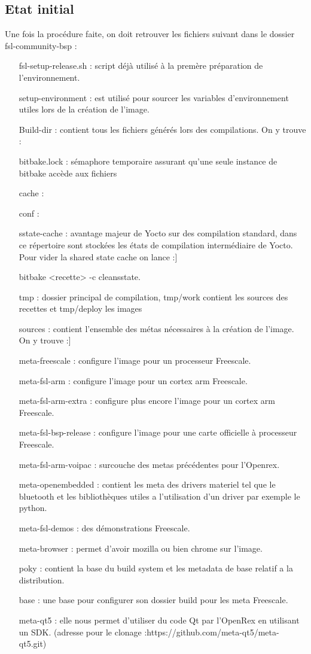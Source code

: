 	\subsection{Etat initial}
	Une fois la procédure faite, on doit retrouver les fichiers suivant dans le
	dossier fsl-community-bsp :
	\begin{itemize}
		\item[fsl-setup-release.sh :] script déjà utilisé à la premère préparation
		de l’environnement.
		\item[setup-environment :] est utilisé pour sourcer les variables d'environnement
		utiles lors de la création de l'image.
		\item[Build-dir :] contient tous les fichiers générés lors des compilations.
		On y trouve :
		\item[bitbake.lock :] sémaphore temporaire assurant qu’une seule instance de bitbake
		accède aux fichiers
		\item[cache :]
		\item[conf :]
		\item[sstate-cache :] avantage majeur de Yocto sur des compilation standard, dans ce répertoire sont stockées les états de compilation intermédiaire de Yocto. Pour vider la shared state cache on lance :]
		\begin{tcolorbox}
			bitbake <recette> -c cleansstate.
		\end{tcolorbox}

		\item[tmp :] dossier principal de compilation, tmp/work contient les sources des recettes et tmp/deploy les images
		\item[sources :] contient l'ensemble des     métas nécessaires à la création de l'image. On y trouve :]
		\item[meta-freescale :] configure l’image pour un processeur Freescale.
		\item[meta-fsl-arm :] configure l'image pour un cortex arm Freescale.
		\item[meta-fsl-arm-extra :] configure plus encore l'image pour un cortex arm Freescale.
		\item[meta-fsl-bsp-release :] configure l’image pour une carte officielle à processeur Freescale.
		\item[meta-fsl-arm-voipac :] surcouche des metas précédentes pour l’Openrex.
		\item[meta-openembedded :] contient les meta des drivers materiel tel que le bluetooth et les bibliothèques utiles a l'utilisation d’un driver par exemple le python.
		\item[meta-fsl-demos :] des démonstrations Freescale.
		\item[meta-browser :] permet d’avoir mozilla ou bien chrome sur l’image.
		\item[poky :] contient la base du build system et les metadata de base relatif a la distribution.
		\item[base :] une base pour configurer son dossier build pour les meta Freescale.
		\item[meta-qt5 :] elle nous permet d'utiliser du code Qt par l’OpenRex en utilisant un SDK. (adresse pour le clonage :https://github.com/meta-qt5/meta-qt5.git)


\end{itemize}
